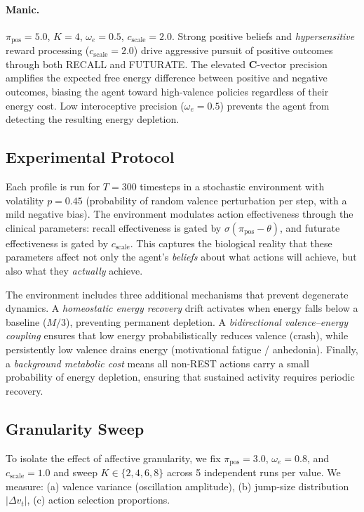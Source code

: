 \documentclass[11pt,a4paper]{article}
\begin{document}
\paragraph{Manic.} $\pi_{\text{pos}} = 5.0$, $K = 4$, $\omega_e = 0.5$, $c_{\text{scale}} = 2.0$. Strong positive beliefs and \emph{hypersensitive} reward processing ($c_{\text{scale}} = 2.0$) drive aggressive pursuit of positive outcomes through both RECALL and FUTURATE. The elevated $\mathbf{C}$-vector precision amplifies the expected free energy difference between positive and negative outcomes, biasing the agent toward high-valence policies regardless of their energy cost. Low interoceptive precision ($\omega_e = 0.5$) prevents the agent from detecting the resulting energy depletion.

\subsection{Experimental Protocol}

Each profile is run for $T = 300$ timesteps in a stochastic environment with volatility $p = 0.45$ (probability of random valence perturbation per step, with a mild negative bias). The environment modulates action effectiveness through the clinical parameters: recall effectiveness is gated by $\sigma(\pi_{\text{pos}} - \theta)$, and futurate effectiveness is gated by $c_{\text{scale}}$. This captures the biological reality that these parameters affect not only the agent's \emph{beliefs} about what actions will achieve, but also what they \emph{actually} achieve.

The environment includes three additional mechanisms that prevent degenerate dynamics. A \emph{homeostatic energy recovery} drift activates when energy falls below a baseline ($M/3$), preventing permanent depletion. A \emph{bidirectional valence--energy coupling} ensures that low energy probabilistically reduces valence (crash), while persistently low valence drains energy (motivational fatigue / anhedonia). Finally, a \emph{background metabolic cost} means all non-REST actions carry a small probability of energy depletion, ensuring that sustained activity requires periodic recovery.

\subsection{Granularity Sweep}

To isolate the effect of affective granularity, we fix $\pi_{\text{pos}} = 3.0$, $\omega_e = 0.8$, and $c_{\text{scale}} = 1.0$ and sweep $K \in \{2, 4, 6, 8\}$ across 5 independent runs per value. We measure: (a) valence variance (oscillation amplitude), (b) jump-size distribution $|\Delta v_t|$, (c) action selection proportions.
\end{document}
